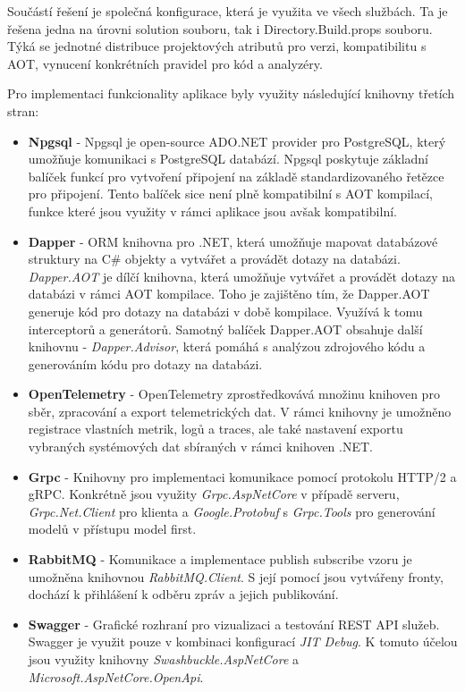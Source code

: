 Součástí řešení je společná konfigurace, která je využita ve všech službách. Ta je řešena jedna na úrovni solution souboru, tak i Directory.Build.props souboru. Týká se jednotné distribuce projektových atributů pro verzi, kompatibilitu s AOT, vynucení konkrétních pravidel pro kód a analyzéry.


Pro implementaci funkcionality aplikace byly využity následující knihovny třetích stran:

\begin{itemize}
  \item \textbf{Npgsql} - Npgsql je open-source ADO.NET provider pro PostgreSQL, který umožňuje komunikaci s PostgreSQL databází. Npgsql poskytuje základní balíček funkcí pro vytvoření připojení na základě standardizovaného řetězce pro připojení. Tento balíček sice není plně kompatibilní s AOT kompilací, funkce které jsou využity v rámci aplikace jsou avšak kompatibilní.
  \item \textbf{Dapper} - ORM knihovna pro .NET, která umožňuje mapovat databázové struktury na C\# objekty a vytvářet a provádět dotazy na databázi. \emph{Dapper.AOT} je dílčí knihovna, která umožňuje vytvářet a provádět dotazy na databázi v rámci AOT kompilace. Toho je zajištěno tím, že Dapper.AOT generuje kód pro dotazy na databázi v době kompilace. Využívá k tomu interceptorů a generátorů. Samotný balíček Dapper.AOT obsahuje další knihovnu - \emph{Dapper.Advisor}, která pomáhá s analýzou zdrojového kódu a generováním kódu pro dotazy na databázi.
  \item \textbf{OpenTelemetry} - OpenTelemetry zprostředkovává množinu knihoven pro sběr, zpracování a export telemetrických dat. V rámci knihovny je umožněno registrace vlastních metrik, logů a traces, ale také nastavení exportu vybraných systémových dat sbíraných v rámci knihoven .NET.
  \item \textbf{Grpc} - Knihovny pro implementaci komunikace pomocí protokolu HTTP/2 a gRPC. Konkrétně jsou využity \emph{Grpc.AspNetCore} v případě serveru, \emph{Grpc.Net.Client} pro klienta a \emph{Google.Protobuf} s \emph{Grpc.Tools} pro generování modelů v přístupu model first.
  \item \textbf{RabbitMQ} - Komunikace a implementace publish subscribe vzoru je umožněna knihovnou \emph{RabbitMQ.Client}. S její pomocí jsou vytvářeny fronty, dochází k přihlášení k odběru zpráv a jejich publikování.
  \item \textbf{Swagger} - Grafické rozhraní pro vizualizaci a testování REST API služeb. Swagger je využit pouze v kombinaci konfigurací \emph{JIT Debug}. K tomuto účelou jsou využity knihovny \emph{Swashbuckle.AspNetCore} a \emph{Microsoft.AspNetCore.OpenApi}.
\end{itemize}

